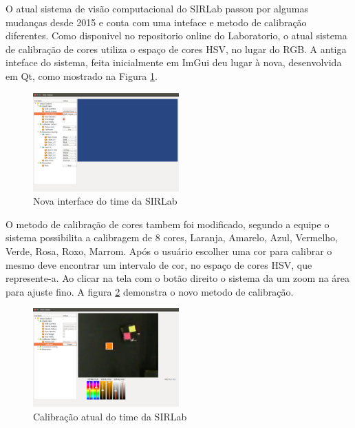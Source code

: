 O atual sistema de visão computacional do SIRLab passou por algumas mudanças desde 2015 e conta com uma inteface e metodo de calibração diferentes\cite{VSSVision}. 
Como disponivel no repositorio online do Laboratorio, o atual sistema de calibração de cores utiliza o espaço de cores HSV, no lugar do RGB\cite{Rosa:2015}. A antiga inteface do sistema, feita inicialmente em ImGui deu lugar à nova, desenvolvida em Qt, como mostrado na Figura \ref{SIRLabNova}.
\begin{figure}[!h]
	\centering
	\includegraphics[width=0.5\textwidth]{vsssnovonormal.png} 	
	\caption{Nova interface do time da SIRLab \cite{VSSVision}}
	\label{SIRLabNova}
\end{figure}

O metodo de calibração de cores tambem foi modificado, segundo a equipe\cite{VSSVision} o sistema possibilita a calibragem de 8 cores, Laranja, Amarelo, Azul, Vermelho, Verde, Rosa, Roxo, Marrom. Após o usuário escolher uma cor para calibrar o mesmo deve encontrar um intervalo de cor, no espaço de cores HSV, que represente-a. Ao clicar na tela com o botão direito o sistema da um zoom na área para ajuste fino. A figura \ref{SIRLabNovaCalibracao} demonstra o novo metodo de calibração.

\begin{figure}[!h]
	\centering
	\includegraphics[width=0.5\textwidth]{vsssnovo.png} 	
	\caption{Calibração atual do time da SIRLab \cite{VSSVision}}
	\label{SIRLabNovaCalibracao}
\end{figure}
